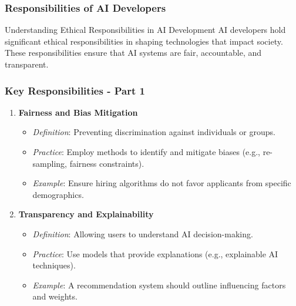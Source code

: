 \documentclass[aspectratio=169]{beamer}
\begin{document}
\begin{frame}[fragile]
    \frametitle{Responsibilities of AI Developers}
    \begin{block}{Understanding Ethical Responsibilities in AI Development}
        AI developers hold significant ethical responsibilities in shaping technologies that impact society. These responsibilities ensure that AI systems are fair, accountable, and transparent.
    \end{block}
\end{frame}

\begin{frame}[fragile]
    \frametitle{Key Responsibilities - Part 1}
    \begin{enumerate}
        \item \textbf{Fairness and Bias Mitigation}
        \begin{itemize}
            \item \textit{Definition}: Preventing discrimination against individuals or groups.
            \item \textit{Practice}: Employ methods to identify and mitigate biases (e.g., re-sampling, fairness constraints).
            \item \textit{Example}: Ensure hiring algorithms do not favor applicants from specific demographics.
        \end{itemize}
        
        \item \textbf{Transparency and Explainability}
        \begin{itemize}
            \item \textit{Definition}: Allowing users to understand AI decision-making.
            \item \textit{Practice}: Use models that provide explanations (e.g., explainable AI techniques).
            \item \textit{Example}: A recommendation system should outline influencing factors and weights.
        \end{itemize}
    \end{enumerate}
\end{frame}
\end{document}

